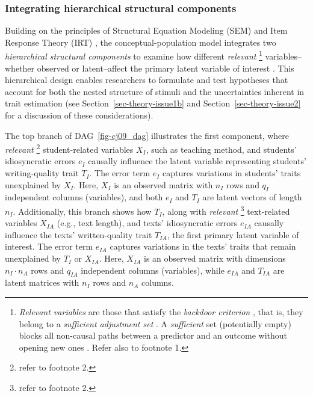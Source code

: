 \documentclass[
  authoryear,
  review,
  1p]{elsarticle}
\begin{document}
\subsubsection{Integrating hierarchical structural
components}\label{sec-theory-theoretical_P3}

Building on the principles of Structural Equation Modeling (SEM)
\citep{Hoyle_et_al_2023} and Item Response Theory (IRT)
\citep{Fox_2010, vanderLinden_et_al_2017_I}, the conceptual-population
model integrates two \emph{hierarchical structural components} to
examine how different \emph{relevant} \footnote{\emph{Relevant
  variables} are those that satisfy the \emph{backdoor criterion}
  \citep[pp 37]{Neal_2020}, that is, they belong to a \emph{sufficient
  adjustment set}
  \citep{Pearl_2009, Pearl_et_al_2016, Morgan_et_al_2014}. A
  \emph{sufficient} set (potentially empty) blocks all non-causal paths
  between a predictor and an outcome without opening new ones
  \citep{Pearl_2009}. Refer also to footnote 1.} variables--whether
observed or latent--affect the primary latent variable of interest
\citep{Everitt_et_al_2010}. This hierarchical design enables researchers
to formulate and test hypotheses that account for both the nested
structure of stimuli and the uncertainties inherent in trait estimation
(see Section~\ref{sec-theory-issue1b} and
Section~\ref{sec-theory-issue2} for a discussion of these
considerations).

The top branch of DAG~\ref{fig-cj09_dag} illustrates the first
component, where \emph{relevant} \footnote{refer to footnote 2.}
student-related variables \(X_{I}\), such as teaching method, and
students' idiosyncratic errors \(e_{I}\) causally influence the latent
variable representing students' writing-quality trait \(T_{I}\). The
error term \(e_{I}\) captures variations in students' traits unexplained
by \(X_{I}\). Here, \(X_{I}\) is an observed matrix with \(n_{I}\) rows
and \(q_{I}\) independent columns (variables), and both \(e_{I}\) and
\(T_{I}\) are latent vectors of length \(n_{I}\). Additionally, this
branch shows how \(T_{I}\), along with \emph{relevant} \footnote{refer
  to footnote 2.} text-related variables \(X_{IA}\) (e.g., text length),
and texts' idiosyncratic errors \(e_{IA}\) causally influence the texts'
written-quality trait \(T_{IA}\), the first primary latent variable of
interest. The error term \(e_{IA}\) captures variations in the texts'
traits that remain unexplained by \(T_{I}\) or \(X_{IA}\). Here,
\(X_{IA}\) is an observed matrix with dimensions \(n_{I} \cdot n_{A}\)
rows and \(q_{IA}\) independent columns (variables), while \(e_{IA}\)
and \(T_{IA}\) are latent matrices with \(n_{I}\) rows and \(n_{A}\)
columns.
\end{document}
